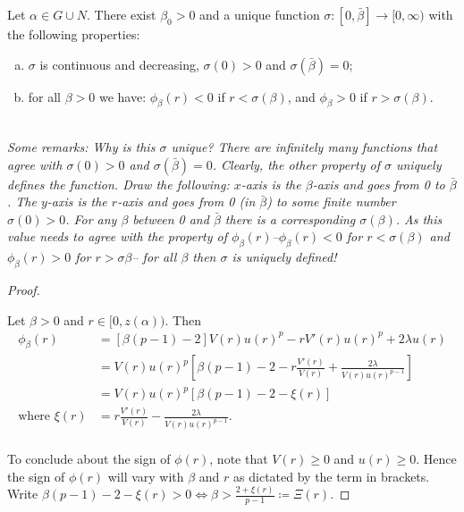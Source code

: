 \newpage
\begin{lemma}Let $\alpha\in G\cup N$. There exist $\beta_0>0$ and a unique function $\sigma:[0,\bar\beta]\to[0,\infty)$ with the following properties: \begin{enumerate}[(a)]
	\item  $\sigma$ is continuous and decreasing, $\sigma(0)>0$ and $\sigma(\bar\beta)=0$;
    \item for all $\beta>0$ we have: $\phi_\beta(r)<0$ if $r<\sigma(\beta)$, and $\phi_\beta>0$ if $r>\sigma(\beta)$.
\end{enumerate}
\emph{}\\[11pt]\emph{Some remarks: Why is this $\sigma$ unique? There are infinitely many functions that agree with $\sigma(0)>0$ and $\sigma(\bar{\beta})=0$. Clearly, the other property of $\sigma$ uniquely defines the function. Draw the following: $x$-axis is the $\beta$-axis and goes from 0 to $\bar{\beta}$. The $y$-axis is the $r$-axis and goes from 0 (in $\bar{\beta}$) to some finite number $\sigma(0)>0$. For any $\beta$ between 0 and $\bar{\beta}$ there is a corresponding $\sigma(\beta)$. As this value needs to agree with the property of $\phi_{\beta}(r)$--$\phi_{\beta}(r)<0$ for $r<\sigma(\beta)$ and $\phi_{\beta}(r)>0$ for $r>\sigma{\beta}$-- for all $\beta$ then $\sigma$ is uniquely defined!}\\[11pt]


\begin{proof}
	\begin{outlines}
		\1 
		\1
		\1
		\1
	\end{outlines}
Let $\beta>0$ and $r\in[0,z(\alpha))$. Then \begin{align*}
\phi_{\beta}(r)&=\left[\beta(p-1)-2\right]V(r)u(r)^p-rV'(r)u(r)^p+2\lambda u(r) %
\\ &=V(r)u(r)^p\left[\beta(p-1)-2-r\frac{V'(r)}{V(r)}+\frac{2\lambda}{V(r)u(r)^{p-1}}\right]
\\ &= V(r)u(r)^p\left[\beta(p-1)-2-\xi(r)\right]
\\\text{where }\xi(r)&=r\frac{V'(r)}{V(r)}-\frac{2\lambda}{V(r)u(r)^{p-1}}.
\end{align*}
\\
To conclude about the sign of $\phi(r)$, note that $V(r)\geq0$ and $u(r)\geq0$. Hence the sign of $\phi(r)$ will vary with $\beta$ and $r$ as dictated by the term in brackets. Write $\beta(p-1)-2-\xi(r)>0\iff\beta>\frac{2+\xi(r)}{p-1}\coloneqq\Xi(r)$.


\end{proof}
\end{lemma}
